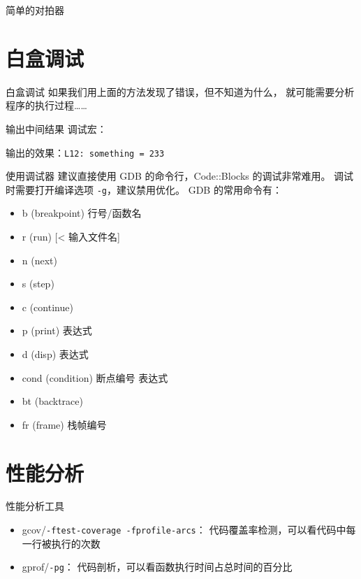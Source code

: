 \documentclass[10pt,mathserif]{beamer}%
\begin{document}
\begin{frame}{简单的对拍器}
	
\end{frame}

\section{白盒调试}
\begin{frame}{白盒调试}
	如果我们用上面的方法发现了错误，但不知道为什么，
	就可能需要分析程序的执行过程……
\end{frame}

\begin{frame}{输出中间结果}
	调试宏：
	
	输出的效果：\lstinline!L12: something = 233!
\end{frame}

\begin{frame}{使用调试器}
	建议直接使用 GDB 的命令行，Code::Blocks 的调试非常难用。
	调试时需要打开编译选项 \lstinline!-g!，建议禁用优化。
	GDB 的常用命令有：
	\begin{itemize}
		\item b (breakpoint) 行号/函数名
		\item r (run) [< 输入文件名]
		\item n (next)
		\item s (step)
		\item c (continue)
		\item p (print) 表达式
		\item d (disp) 表达式
		\item cond (condition) 断点编号 表达式
		\item bt (backtrace)
		\item fr (frame) 栈帧编号
	\end{itemize}
\end{frame}

\section{性能分析}
\begin{frame}{性能分析工具}
	\begin{itemize}
		\item gcov/\lstinline|-ftest-coverage -fprofile-arcs|：
			代码覆盖率检测，可以看代码中每一行被执行的次数
		\item gprof/\lstinline|-pg|：
			代码剖析，可以看函数执行时间占总时间的百分比
	\end{itemize}
\end{frame}
\end{document}
